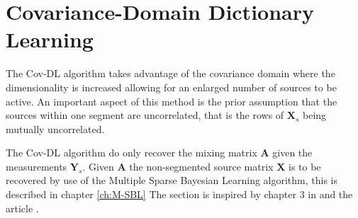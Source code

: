 \section{Covariance-Domain Dictionary Learning}\label{sec:cov}
The Cov-DL algorithm takes advantage of the covariance domain where the dimensionality is increased allowing for an enlarged number of sources to be active. 
An important aspect of this method is the prior assumption that the sources within one segment are uncorrelated, that is the rows of $\textbf{X}_s$ being mutually uncorrelated. 

The Cov-DL algorithm do only recover the mixing matrix $\mathbf{A}$ given the measurements $\textbf{Y}_s$. Given $\textbf{A}$ the non-segmented source matrix $\mathbf{X}$ is to be recovered by use of the Multiple Sparse Bayesian Learning algorithm, this is described in chapter \ref{ch:M-SBL} 
The section is inspired by chapter 3 in \cite{phd2015} and the article \cite{Balkan2015}.

